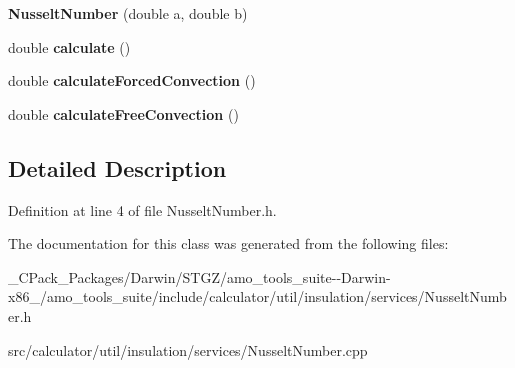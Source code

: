 \begin{DoxyCompactItemize}
{\bfseries Nusselt\+Number} (double a, double b)
\item 
\mbox{\label{class_nusselt_number_a1fd0f2136edae439b1eeaa0f63179316}} 
double {\bfseries calculate} ()
\item 
\mbox{\label{class_nusselt_number_a399ebf734457a199a51d54c992062d96}} 
double {\bfseries calculate\+Forced\+Convection} ()
\item 
\mbox{\label{class_nusselt_number_a5530fb995e97eedd4ca171f8019987d8}} 
double {\bfseries calculate\+Free\+Convection} ()
\end{DoxyCompactItemize}


\subsection{Detailed Description}


Definition at line 4 of file Nusselt\+Number.\+h.



The documentation for this class was generated from the following files\+:\begin{DoxyCompactItemize}
\item 
\+\_\+\+C\+Pack\+\_\+\+Packages/\+Darwin/\+S\+T\+G\+Z/amo\+\_\+tools\+\_\+suite-\/-\/\+Darwin-\/x86\+\_/amo\+\_\+tools\+\_\+suite/include/calculator/util/insulation/services/Nusselt\+Number.\+h\item 
src/calculator/util/insulation/services/Nusselt\+Number.\+cpp\end{DoxyCompactItemize}
